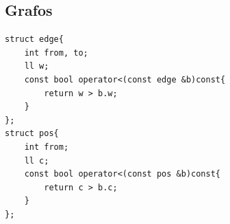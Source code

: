 \documentclass[10pt,spanish,mexico]{article}
\numberwithin{equation}{section}
\begin{document}
\begin{multicols}{2}

\vspace{-1.2\baselineskip}
\hrulefill
\section{Grafos}
\begin{verbatim}
struct edge{
    int from, to;
    ll w;
    const bool operator<(const edge &b)const{
        return w > b.w;
    }
};
struct pos{
    int from;
    ll c;
    const bool operator<(const pos &b)const{
        return c > b.c;
    }
};
\end{verbatim}

\vspace{-\baselineskip}
\hrulefill

\end{multicols}
\end{document}
